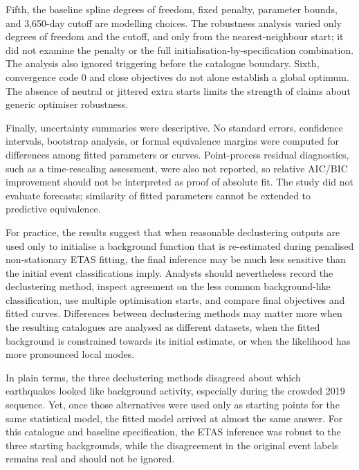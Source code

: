 Fifth, the baseline spline degrees of freedom, fixed penalty, parameter
bounds, and 3,650-day cutoff are modelling choices. The robustness analysis
varied only degrees of freedom and the cutoff, and only from the
nearest-neighbour start; it did not examine the penalty or the full
initialisation-by-specification combination. The analysis also ignored
triggering before the catalogue boundary. Sixth, convergence code 0 and close
objectives do not alone establish a global optimum. The absence of neutral or
jittered extra starts limits the strength of claims about generic optimiser
robustness.

Finally, uncertainty summaries were descriptive. No standard errors,
confidence intervals, bootstrap analysis, or formal equivalence margins were
computed for differences among fitted parameters or curves. Point-process
residual diagnostics, such as a time-rescaling assessment, were also not
reported, so relative AIC/BIC improvement should not be interpreted as proof
of absolute fit. The study did not evaluate forecasts; similarity of fitted
parameters cannot be extended to predictive equivalence.

For practice, the results suggest that when reasonable declustering outputs
are used only to initialise a background function that is re-estimated during
penalised non-stationary ETAS fitting, the final inference may be much less
sensitive than the initial event classifications imply. Analysts should
nevertheless record the declustering method, inspect agreement on the less
common background-like classification, use multiple optimisation starts, and
compare final objectives and fitted curves. Differences between declustering
methods may matter more when the resulting catalogues are analysed as
different datasets, when the fitted background is constrained towards its
initial estimate, or when the likelihood has more pronounced local modes.

In plain terms, the three declustering methods disagreed about which
earthquakes looked like background activity, especially during the crowded
2019 sequence. Yet, once those alternatives were used only as starting points
for the same statistical model, the fitted model arrived at almost the same
answer. For this catalogue and baseline specification, the ETAS inference was
robust to the three starting backgrounds, while the disagreement in the
original event labels remains real and should not be ignored.
